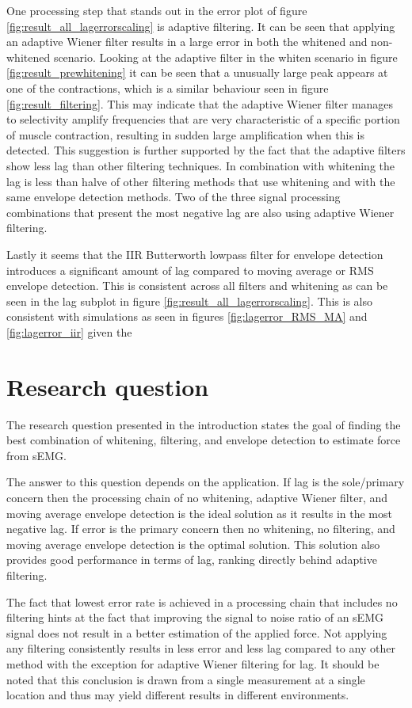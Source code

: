 One processing step that stands out in the error plot of figure \ref{fig:result_all_lagerrorscaling} is adaptive filtering. It can be seen that applying an adaptive Wiener filter results in a large error in both the whitened and non-whitened scenario. Looking at the adaptive filter in the whiten scenario in figure \ref{fig:result_prewhitening} it can be seen that a unusually large peak appears at one of the contractions, which is a similar behaviour seen in figure \ref{fig:result_filtering}. This may indicate that the adaptive Wiener filter manages to selectivity amplify frequencies that are very characteristic of a specific portion of muscle contraction, resulting in sudden large amplification when this is detected. This suggestion is further supported by the fact that the adaptive filters show less lag than other filtering techniques. In combination with whitening the lag is less than halve of other filtering methods that use whitening and with the same envelope detection methods. Two of the three signal processing combinations that present the most negative lag are also using adaptive Wiener filtering.

Lastly it seems that the IIR Butterworth lowpass filter for envelope detection introduces a significant amount of lag compared to moving average or RMS envelope detection. This is consistent across all filters and whitening as can be seen in the lag subplot in figure \ref{fig:result_all_lagerrorscaling}. This is also consistent with simulations as seen in figures \ref{fig:lagerror_RMS_MA} and \ref{fig:lagerror_iir} given the 

\section{Research question}
The research question presented in the introduction states the goal of finding the best combination of whitening, filtering, and envelope detection to estimate force from sEMG. 

The answer to this question depends on the application. If lag is the sole/primary concern then the processing chain of no whitening, adaptive Wiener filter, and moving average envelope detection is the ideal solution as it results in the most negative lag. If error is the primary concern then no whitening, no filtering, and moving average envelope detection is the optimal solution. This solution also provides good performance in terms of lag, ranking directly behind adaptive filtering.

The fact that lowest error rate is achieved in a processing chain that includes no filtering hints at the fact that improving the signal to noise ratio of an sEMG signal does not result in a better estimation of the applied force. Not applying any filtering consistently results in less error and less lag compared to any other method with the exception for adaptive Wiener filtering for lag. It should be noted that this conclusion is drawn from a single measurement at a single location and thus may yield different results in different environments. 

